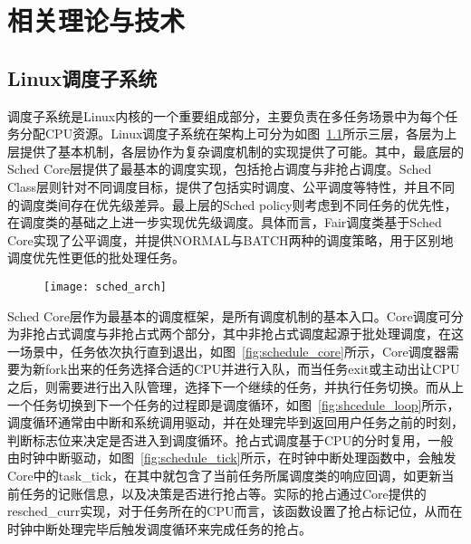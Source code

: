\chapter{相关理论与技术}\label{chap:theories_tech}

\section{Linux调度子系统}


调度子系统是Linux内核的一个重要组成部分，主要负责在多任务场景中为每个任务分配CPU资源。Linux调度子系统在架构上可分为如图~\ref{fig:sched_arch}所示三层，各层为上层提供了基本机制，各层协作为复杂调度机制的实现提供了可能。其中，最底层的Sched Core层提供了最基本的调度实现，包括抢占调度与非抢占调度。Sched Class层则针对不同调度目标，提供了包括实时调度、公平调度等特性，并且不同的调度类间存在优先级差异。最上层的Sched policy则考虑到不同任务的优先性，在调度类的基础之上进一步实现优先级调度。具体而言，Fair调度类基于Sched Core实现了公平调度，并提供NORMAL与BATCH两种的调度策略，用于区别地调度优先性更低的批处理任务。

\begin{figure}[!htbp]
    \centering
    \texttt{[image: sched\_arch]}
    \label{fig:sched_arch}
\end{figure}

Sched Core层作为最基本的调度框架，是所有调度机制的基本入口。Core调度可分为非抢占式调度与非抢占式两个部分，其中非抢占式调度起源于批处理调度，在这一场景中，任务依次执行直到退出，如图~\ref{fig:schedule_core}所示，Core调度器需要为新fork出来的任务选择合适的CPU并进行入队，而当任务exit或主动出让CPU之后，则需要进行出入队管理，选择下一个继续的任务，并执行任务切换。而从上一个任务切换到下一个任务的过程即是调度循环，如图~\ref{fig:shcedule_loop}所示，调度循环通常由中断和系统调用驱动，并在处理完毕到返回用户任务之前的时刻，判断标志位来决定是否进入到调度循环。抢占式调度基于CPU的分时复用，一般由时钟中断驱动，如图~\ref{fig:schedule_tick}所示，在时钟中断处理函数中，会触发Core中的task\_tick，在其中就包含了当前任务所属调度类的响应回调，如更新当前任务的记账信息，以及决策是否进行抢占等。实际的抢占通过Core提供的resched\_curr实现，对于任务所在的CPU而言，该函数设置了抢占标记位，从而在时钟中断处理完毕后触发调度循环来完成任务的抢占。


